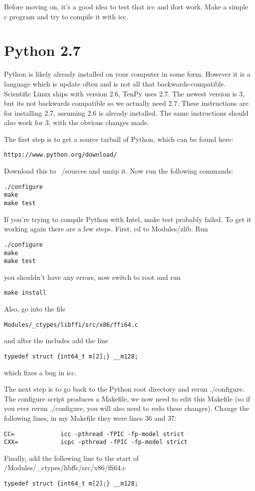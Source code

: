 Before moving on, it's a good idea to test that icc and ifort work. Make a simple c program and try to compile it with icc.

\section{Python 2.7}
Python is likely already installed on your computer in some form. However it is a language which is update often and is not all that backwards-compatible. Scientific Linux ships with version 2.6, TenPy uses 2.7. The newest version is 3, but its not backwards compatible so we actually need 2.7. These instructions are for installing 2.7, assuming 2.6 is already installed. The same instructions should also work for 3, with the obvious changes made.

The first step is to get a source tarball of Python, which can be found here:
\begin{verbatim}
https://www.python.org/download/
\end{verbatim}
Download this to ~/sources and unzip it. Now run the following commands:
\begin{verbatim}
./configure
make
make test
\end{verbatim}

If you're trying to compile Python with Intel, make test probably failed. To get it working again there are a few steps. First, cd to Modules/zlib. Run 
\begin{verbatim}
./configure
make
make test
\end{verbatim}
you shouldn't have any errors, now switch to root and run
\begin{verbatim}
make install
\end{verbatim}
Also, go into the file 
\begin{verbatim}
Modules/_ctypes/libffi/src/x86/ffi64.c 
\end{verbatim}

and after the includes add the line

\begin{verbatim}
typedef struct {int64_t m[2];} __m128;
\end{verbatim}
which fixes a bug in icc.

The next step is to go back to the Python root directory and rerun ./configure. The configure script produces a Makefile, we now need to edit this Makefile (so if you ever rerun ./configure, you will also need to redo these changes). Change the following lines, in my Makefile they were lines 36 and 37:
\begin{verbatim}
CC=             icc -pthread -fPIC -fp-model strict
CXX=            icpc -pthread -fPIC -fp-model strict
\end{verbatim}
Finally, add the following line to the start of /Modules/\_ctypes/libffc/src/x86/ffi64.c
\begin{verbatim}
typedef struct {int64_t m[2];} __m128;
\end{verbatim}

